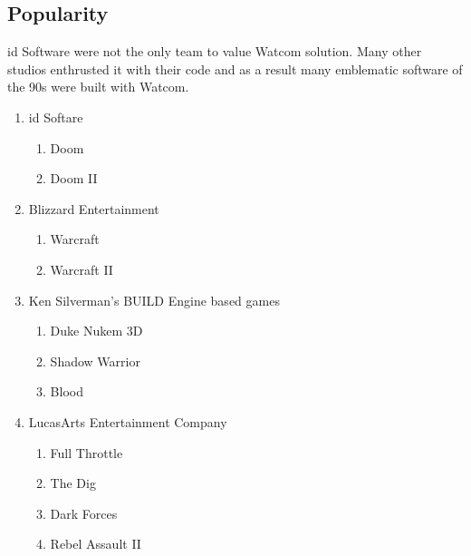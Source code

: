 \subsection{Popularity}
id Software were not the only team to value Watcom solution. Many other studios enthrusted it with their code and as a result many emblematic software of the 90s were built with Watcom.\\
\begin{enumerate}
\item id Softare 
       \begin{enumerate}
       \item Doom
       \item Doom II
       \end{enumerate} 
\item Blizzard Entertainment 
       \begin{enumerate}
       \item Warcraft
       \item Warcraft II
       \end{enumerate}
\item Ken Silverman's BUILD Engine based games
      \begin{enumerate}
       \item Duke Nukem 3D
       \item Shadow Warrior
       \item Blood
       \end{enumerate}
\item LucasArts Entertainment Company
      \begin{enumerate}
       \item Full Throttle
       \item  The Dig
       \item Dark Forces
       \item Rebel Assault II       
      \end{enumerate}
\end{enumerate}
\par
